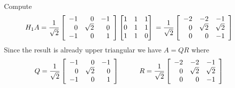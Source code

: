 \begin{example}
\begin{align*}
\end{align*}
Compute
$$
H_1A 
=
\frac{1}{\sqrt{2}} \left[ \begin{array}{rrr} - 1 & 0 & - 1 \\ 0 & \sqrt{2} & 0 \\ - 1 & 0 & 1 \end{array} \right]
\begin{bmatrix} 1 & 1 & 1 \\ 0 & 1 & 1 \\ 1 & 1 & 0 \end{bmatrix} \\
= \frac{1}{\sqrt{2}} \left[ \begin{array}{rrr} - 2 & -2 & - 1 \\ 0 & \sqrt{2} & \sqrt{2} \\ 0 & 0 & -1 \end{array} \right]
$$
Since the result is already upper triangular we have $A = QR$ where
$$
Q = \frac{1}{\sqrt{2}} \left[ \begin{array}{rrr} - 1 & 0 & - 1 \\ 0 & \sqrt{2} & 0 \\ - 1 & 0 & 1 \end{array} \right]
\hspace{10mm}
R = \frac{1}{\sqrt{2}} \left[ \begin{array}{rrr} - 2 & -2 & - 1 \\ 0 & \sqrt{2} & \sqrt{2} \\ 0 & 0 & -1 \end{array} \right]
$$


\end{example}
